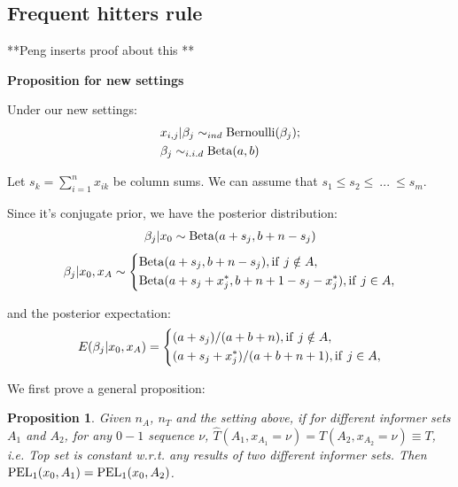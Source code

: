 \documentclass[12pt]{article}
\newtheorem{proposition}{Proposition}
\begin{document}
\subsection{Frequent hitters rule}

**Peng inserts proof about this **

\textbf{Proposition for new settings}

Under our new settings:
\begin{eqnarray*}
&x_{i,j}|\beta_j \sim_{ind} {\rm Bernoulli}(\beta_j);\\
&\beta_j \sim_{i.i.d} {\rm Beta}(a,b)
\end{eqnarray*}

Let $s_k = \sum_{i = 1}^n x_{ik}$ be column sums. We can assume that $s_1 \leq s_2 \leq~...~\leq s_m$.

Since it's conjugate prior, we have the posterior distribution:
\begin{eqnarray*}
\beta_j | x_0 \sim {\rm Beta}(a + s_j, b + n - s_j)
\end{eqnarray*}
\begin{equation}
\beta_j|x_0,x_A \sim \left\{
\begin{aligned}
&{\rm Beta}(a+s_j, b+n-s_j),{\rm if}~j\notin A,\\
&{\rm Beta}(a+s_j+x_j^*, b+n+1-s_j-x_j^*),{\rm if}~j\in A,\\
\end{aligned}
\right.
\end{equation}

and the posterior expectation:
\begin{equation}
E(\beta_j|x_0,x_A) = \left\{
\begin{aligned}
&(a + s_j)/(a + b + n),{\rm if}~j\notin A,\\
&(a + s_j + x_j^*)/(a + b + n +1),{\rm if}~j\in A,\\
\end{aligned}
\right.
\end{equation}

We first prove a general proposition:

\begin{proposition}
Given $n_A$, $n_T$ and the setting above, if for different informer sets $A_1$ and $A_2$, for any $0-1$ sequence $\nu$, $\hat{T}(A_1, x_{A_1} = \nu) = \hat{T}(A_2,x_{A_2} = \nu) \equiv T$, i.e. Top set is constant w.r.t. any results of two different informer sets. Then ${\rm PEL}_1(x_0, A_1) = {\rm PEL}_1(x_0, A_2)$.
\end{proposition}
\end{document}
